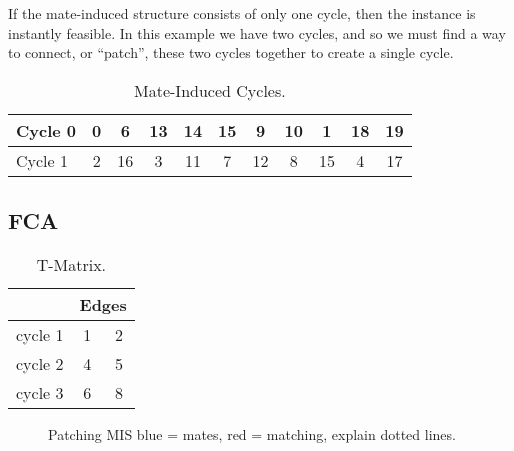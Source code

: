 \documentclass[a4paper, 11pt, twoside, onecolumn, openany]{article}
\begin{document}
If the mate-induced structure consists of only one cycle, then the instance is instantly feasible. In this example we have two cycles, and so we must find a way to connect, or ``patch'', these two cycles together to create a single cycle.


\begin{table}[htb]
	\centering
	\begin{tabular}{|l*{10}{|c}|}
		\hline
		Cycle 0 & 0 & 6 & 13 & 14 & 15 & 9 & 10 & 1 & 18 & 19 \\ \hline
		Cycle 1 & 2 & 16 & 3 & 11 & 7 & 12 & 8 & 15 & 4 & 17 \\
		\hline
	\end{tabular}
	\caption{Mate-Induced Cycles.}	
\end{table}

\subsection{FCA}%



















\begin{table}[htb]
	\centering
	\begin{tabular}{c|c|c|}
		\cline{2-3}
		& \multicolumn{2}{|c|}{Edges} \\ \hline
		\multicolumn{1}{|c|}{cycle 1} & 1 & 2 \\ \hline
		\multicolumn{1}{|c|}{cycle 2} & 4 & 5 \\ \hline
		\multicolumn{1}{|c|}{cycle 3} & 6 & 8 \\
		\hline
	\end{tabular}
	\caption{T-Matrix.}
\end{table}	







\begin{figure}
	\centering
	
	\caption{Patching MIS blue = mates, red = matching, explain dotted lines.}	
\end{figure}
\end{document}
